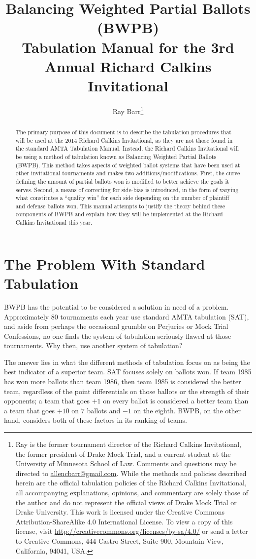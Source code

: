 \documentclass{article}
\title{\textbf{Balancing Weighted Partial Ballots (BWPB)}\\ \large  Tabulation Manual for the 3rd Annual Richard Calkins Invitational}
\author{Ray Barr\footnote{Ray is the former tournament director of the Richard Calkins Invitational, the former president of Drake Mock Trial, and a current student at the University of Minnesota School of Law.  Comments and questions may be directed to \href{mailto:allencbarr@gmail.com}{allencbarr@gmail.com}.  While the methods and policies described herein are the official tabulation policies of the Richard Calkins Invitational, all accompanying explanations, opinions, and commentary are solely those of the author and do not represent the official views of Drake Mock Trial  or Drake University.  This work is licensed under the Creative Commons Attribution-ShareAlike 4.0 International License. To view a copy of this license, visit \url{http://creativecommons.org/licenses/by-sa/4.0/} or send a letter to Creative Commons, 444 Castro Street, Suite 900, Mountain View, California, 94041, USA.}}
\begin{document}
\maketitle
\begin{abstract}
The primary purpose of this document is to describe the tabulation procedures that will be used at the 2014 Richard Calkins Invitational, as they are not those found in the standard AMTA Tabulation Manual.  Instead, the Richard Calkins Invitational will be using a method of tabulation known as Balancing Weighted Partial Ballots (BWPB).  This method takes aspects of weighted ballot systems that have been used at other invitational tournaments and makes two additions/modifications.  First, the curve defining the amount of partial ballots won is modified to better achieve the goals it serves.  Second, a means of correcting for side-bias is introduced, in the form of varying what constitutes a ``quality win'' for each side depending on the number of plaintiff and defense ballots won.  This manual attempts to justify the theory behind these components of BWPB and explain how they will be implemented at the Richard Calkins Invitational this year.
\end{abstract}
\section{The Problem With Standard Tabulation}
BWPB has the potential to be considered a solution in need of a problem.  Approximately 80 tournaments each year use standard AMTA tabulation (SAT), and aside from perhaps the occasional grumble on Perjuries or Mock Trial Confessions, no one finds the system of tabulation seriously flawed at those tournaments.  Why then, use another system of tabulation?

The answer lies in what the different methods of tabulation focus on as being the best indicator of a superior team.  SAT focuses solely on ballots won.  If team 1985 has won more ballots than team 1986, then team 1985 is considered the better team, regardless of the point differentials on those ballots or the strength of their opponents; a team that goes $+1$ on every ballot is considered a better team than a team that goes $+10$ on $7$ ballots and $-1$ on the eighth.  BWPB, on the other hand, considers both of these factors in its ranking of teams.
\end{document}
